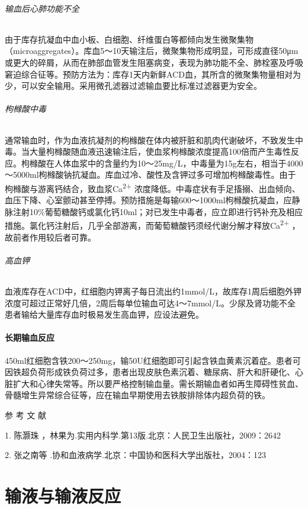 \subparagraph{输血后心肺功能不全}

由于库存抗凝血中血小板、白细胞、纤维蛋白等都倾向发生微聚集物（microaggregates）。库血5～10天输注后，微聚集物形成明显，可形成直径50μm或更大的碎屑，从而在肺部血管发生阻塞病变，表现为肺功能不全、肺栓塞及呼吸窘迫综合征等。预防方法为：库存1天内新鲜ACD血，其所含的微聚集物量相对为少，可以安全输用。采用微孔滤器过滤输血要比标准过滤器更为安全。

\subparagraph{枸橼酸中毒}

通常输血时，作为血液抗凝剂的枸橼酸在体内被肝脏和肌肉代谢破坏，不致发生中毒。当大量枸橼酸随血液迅速输注后，使血浆枸橼酸浓度提高100倍而产生毒性反应。枸橼酸在人体血浆中的含量约为10～25mg/L，中毒量为15g左右，相当于4000～5000ml枸橼酸钠抗凝血。库血过冷、酸性及含钾过多可增加枸橼酸毒性。由于枸橼酸与游离钙结合，致血浆Ca\textsuperscript{2+}
浓度降低。中毒症状有手足搐搦、出血倾向、血压下降、心室颤动甚至停搏。预防措施是每输600～1000ml枸橼酸抗凝血，应静脉注射10\%葡萄糖酸钙或氯化钙10ml；对已发生中毒者，应立即进行钙补充及相应措施。氯化钙注射后，几乎全部游离，而葡萄糖酸钙须经代谢分解才释放Ca\textsuperscript{2+}
，故前者作用较后者可靠。

\subparagraph{高血钾}

血液库存在ACD中，红细胞内钾离子每日流出约1mmol/L，故库存1周后细胞外钾浓度可超过正常好几倍，2周后每单位输血可达4～7mmol/L。少尿及肾功能不全患者输给大量库存血时极易发生高血钾，应设法避免。

\subsubsection{长期输血反应}

450ml红细胞含铁200～250mg，输50U红细胞即可引起含铁血黄素沉着症。患者可因铁超负荷形成铁负荷过多，患者出现皮肤色素沉着、糖尿病、肝大和肝硬化、心脏扩大和心律失常等。所以要严格控制输血量。需长期输血者如再生障碍性贫血、骨髓增生异常综合征等，应在输血早期使用去铁胺排除体内超负荷的铁。

\protect\hypertarget{text00398.html}{}{}

\hypertarget{text00398.htmlux5cux23CHP16-12-3}{}
参 考 文 献

1. 陈灏珠 ，林果为.实用内科学.第13版.北京：人民卫生出版社，2009：2642

2. 张之南等 .协和血液病学.北京：中国协和医科大学出版社，2004：123

\protect\hypertarget{text00399.html}{}{}

\chapter{输液与输液反应}

